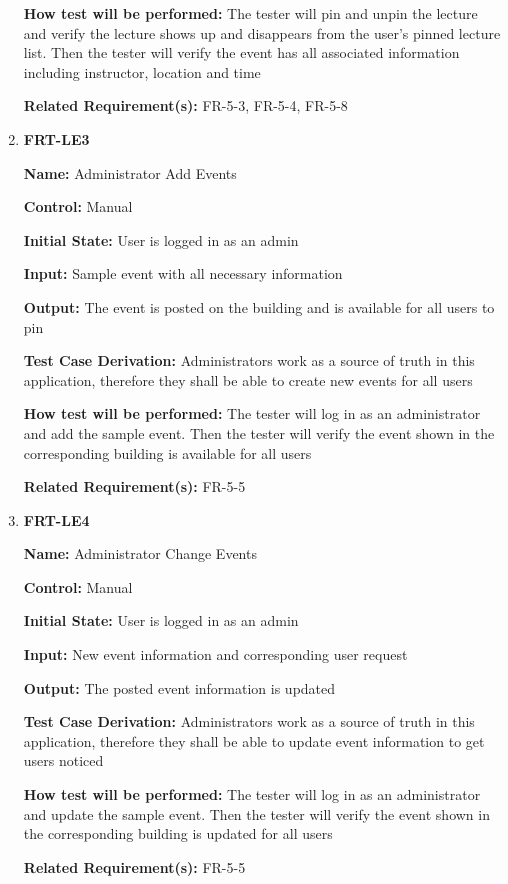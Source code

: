 \documentclass[12pt, titlepage]{article}
\begin{document}
\begin{enumerate}
\textbf{How test will be performed:} The tester will pin and unpin the lecture and verify the lecture shows up and disappears from the user's pinned lecture list. Then the tester will verify the event has all associated information including instructor, location and time

\textbf{Related Requirement(s):} FR-5-3, FR-5-4, FR-5-8

\item{\textbf{FRT-LE3}}

\textbf{Name:} Administrator Add Events

\textbf{Control:} Manual
					
\textbf{Initial State:} User is logged in as an admin

\textbf{Input:} Sample event with all necessary information
					
\textbf{Output:} The event is posted on the building and is available for all users to pin

\textbf{Test Case Derivation:} Administrators work as a source of truth in this application, therefore they shall be able to create new events for all users
					
\textbf{How test will be performed:} The tester will log in as an administrator and add the sample event. Then the tester will verify the event shown in the corresponding building is available for all users

\textbf{Related Requirement(s):} FR-5-5

\item{\textbf{FRT-LE4}}

\textbf{Name:} Administrator Change Events

\textbf{Control:} Manual
					
\textbf{Initial State:} User is logged in as an admin

\textbf{Input:} New event information and corresponding user request
					
\textbf{Output:} The posted event information is updated

\textbf{Test Case Derivation:} Administrators work as a source of truth in this application, therefore they shall be able to update event information to get users noticed
					
\textbf{How test will be performed:} The tester will log in as an administrator and update the sample event. Then the tester will verify the event shown in the corresponding building is updated for all users

\textbf{Related Requirement(s):} FR-5-5


\end{enumerate}
\end{document}
